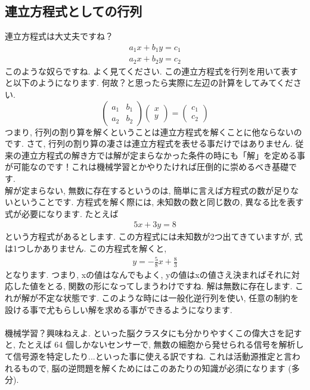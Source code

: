 \documentclass[11pt,a4paper]{jreport}
\begin{document}
\subsection{連立方程式としての行列}
連立方程式は大丈夫ですね？
\begin{eqnarray}
a_1x + b_1y = c_1
\end{eqnarray}
\begin{eqnarray}
a_2x + b_2y = c_2
\end{eqnarray}
このような奴らですね. よく見てください. この連立方程式を行列を用いて表すと以下のようになります. 何故？と思ったら実際に左辺の計算をしてみてください. 
\[
  \left(	
  \begin{array}{cc}
  a_1 & b_1 \\
  a_2 & b_2
  \end{array}
  \right)
  \left(
  \begin{array}{c}
  x \\
  y
  \end{array}
  \right)
  =
  \left(
  \begin{array}{l}
  c_1\\
  c_2
  \end{array}
  \right)
\]
つまり, 行列の割り算を解くということは連立方程式を解くことに他ならないのです. 
さて, 行列の割り算の凄さは連立方程式を表せる事だけではありません. 従来の連立方程式の解き方では解が定まらなかった条件の時にも「解」を定める事が可能なのです！これは機械学習とかやりたければ圧倒的に崇めるべき基礎です.\\
解が定まらない, 無数に存在するというのは, 簡単に言えば方程式の数が足りないということです. 方程式を解く際には, 未知数の数と同じ数の, 異なる比を表す式が必要になります. たとえば
\begin{eqnarray}
5x + 3y = 8
\end{eqnarray}
という方程式があるとします. この方程式には未知数が2つ出てきていますが, 式は1つしかありません. この方程式を解くと, 
\begin{eqnarray}
y = -\frac{5}{8}x + \frac{8}{3}
\end{eqnarray}
となります. つまり, xの値はなんでもよく, yの値はxの値さえ決まればそれに対応した値をとる, 関数の形になってしまうわけですね. 解は無数に存在します. これが解が不定な状態です. このような時には一般化逆行列を使い, 任意の制約を設ける事で尤もらしい解を求める事ができるようになります.\\
\\
機械学習？興味ねえよ. といった脳クラスタにも分かりやすくこの偉大さを記すと, たとえば 64 個しかないセンサーで, 無数の細胞から発せられる信号を解析して信号源を特定したり...といった事に使える訳ですね. これは活動源推定と言われるもので, 脳の逆問題を解くためにはこのあたりの知識が必須になります (多分).
 
\end{document}
